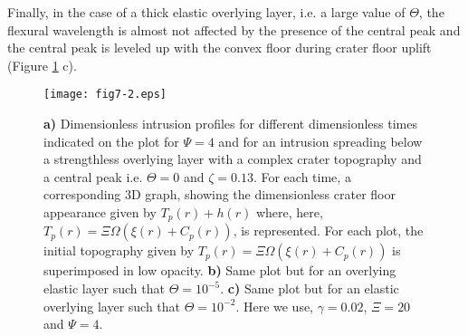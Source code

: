 Finally, in the case of a  thick elastic overlying layer, i.e. a large
value of $\Theta$,  the flexural wavelength is almost  not affected by
the presence  of the central peak  and the central peak  is leveled up
with   the   convex  floor   during   crater   floor  uplift   (Figure
\ref{C5-fig7-2} c).


\begin{figure}[h!]
  \begin{center}
    \graphicspath{{/Users/thorey/Documents/These/Submission/Article/FFC_JGR_2013/Paper_APRES_2nd_REVIEW/}}
    \texttt{[image: fig7-2.eps]}
    \caption{   \textbf{a)}  Dimensionless   intrusion  profiles   for
      different dimensionless times indicated on the plot for $\Psi=4$
      and for  an intrusion  spreading below a  strengthless overlying
      layer  with  a complex  crater  topography  and a  central  peak
      i.e. $\Theta=0$ and $\zeta=0.13$. For each time, a corresponding
      3D  graph, showing  the  dimensionless  crater floor  appearance
      given        by         $T_p(r)+h(r)$        where,        here,
      $T_p(r)=\Xi  \Omega(\xi(r)+C_p(r))$,  is represented.  For  each
      plot,      the       initial      topography       given      by
      $T_p(r)=\Xi  \Omega(\xi(r)+C_p(r))$   is  superimposed   in  low
      opacity.  \textbf{b)} Same  plot  but for  an overlying  elastic
      layer such that $\Theta=10^{-5}$.  \textbf{c)} Same plot but for
      an elastic  overlying layer such that  $\Theta=10^{-2}$. Here we
      use, $\gamma=0.02$, $\Xi=20$ and $\Psi=4$.}
    \label{C5-fig7-2}
  \end{center}
\end{figure}


